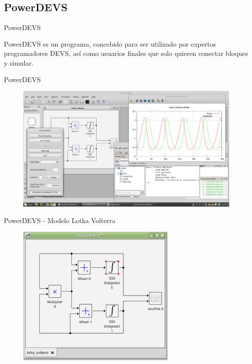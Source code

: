 \documentclass[10pt,presentation]{beamer}
\begin{document}
	\subsection{PowerDEVS}

\begin{frame}{PowerDEVS}
\begin{block}{PowerDEVS} 
 es un programa, concebido para ser utilizado por expertos programadores DEVS, así como usuarios finales que solo quieren 
	conectar bloques y simular.
\end{block}
\end{frame}

\begin{frame}{PowerDEVS}
	\begin{figure}[H]
	  \includegraphics[width=\textwidth]{powerdevs}
	\end{figure}
\end{frame}

\begin{frame}{PowerDEVS - Modelo Lotka Volterra}
\centering
\begin{figure}[H]
	  \includegraphics[width=0.7\textwidth]{lk-powerdevs}
\end{figure}
\end{frame}
\end{document}
